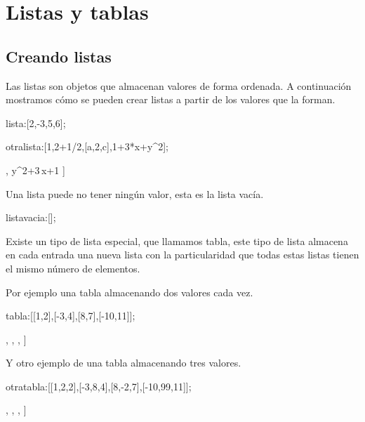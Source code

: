 
\section{Listas y tablas}

\subsection*{Creando listas}

Las listas son objetos que almacenan valores de forma ordenada.
A continuación mostramos cómo se pueden crear listas a partir de
los valores que la forman.

\begin{maximai}
	lista:[2,-3,5,6];
\end{maximai}\begin{maximao}
	\left[ 2 , -3 , 5 , 6 \right]
\end{maximao}\begin{maximai}
	otralista:[1,2+1/2,[a,2,c],1+3*x+y^2];
\end{maximai}\begin{maximao}
	\left[ 1 , {{5}\over{2}} , \left[ a , 2 , c \right]  , y^2+3\,x+1
	\right]
\end{maximao}

Una lista puede no tener ningún valor, esta es la lista vacía.
\begin{maximai}
	listavacia:[];
\end{maximai}\begin{maximao}
	\left[\  \right]
\end{maximao}

Existe un tipo de lista especial, que llamamos tabla, este tipo de lista
almacena en cada entrada una nueva lista con la particularidad que todas
estas listas tienen el mismo número de elementos.

Por ejemplo una tabla almacenando dos valores cada vez.
\begin{maximai}
	tabla:[[1,2],[-3,4],[8,7],[-10,11]];
\end{maximai}\begin{maximao}
	\left[ \left[ 1 , 2 \right]  , \left[ -3 , 4 \right]  , \left[ 8 ,
	7 \right]  , \left[ -10 , 11 \right]  \right]
\end{maximao}
Y otro ejemplo de una tabla almacenando tres valores.
\begin{maximai}
	otratabla:[[1,2,2],[-3,8,4],[8,-2,7],[-10,99,11]];
\end{maximai}\begin{maximao}
	\left[ \left[ 1 , 2 , 2 \right]  , \left[ -3 , 8 , 4 \right]  ,
	\left[ 8 , -2 , 7 \right]  , \left[ -10 , 99 , 11 \right]  \right]
\end{maximao}


